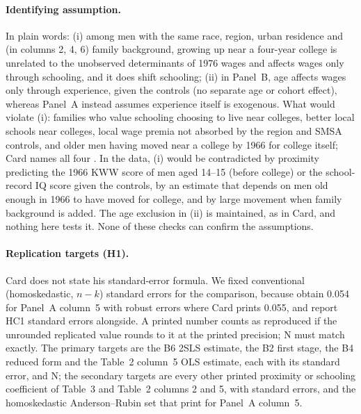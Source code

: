 \documentclass[11pt]{article}
\begin{document}
\paragraph{Identifying assumption.} In plain words: (i) among men with the same race,
region, urban residence and (in columns 2, 4, 6) family background, growing up near a
four-year college is unrelated to the unobserved determinants of 1976 wages and affects
wages only through schooling, and it does shift schooling; (ii) in Panel~B, age affects
wages only through experience, given the controls (no separate age or cohort effect),
whereas Panel~A instead assumes experience itself is exogenous. What would violate (i):
families who value schooling choosing to live near colleges, better local schools near
colleges, local wage premia not absorbed by the region and SMSA controls, and older men
having moved near a college by 1966 for college itself; Card names all four
\citep[pp.~16--18]{card1993nber}. In the data, (i) would be contradicted by proximity
predicting the 1966 KWW score of men aged 14--15 (before college) or the school-record IQ
score given the controls, by an estimate that depends on men old enough in 1966 to have
moved for college, and by large movement when family background is added. The age
exclusion in (ii) is maintained, as in Card, and nothing here tests it. None of these
checks can confirm the assumptions.

\paragraph{Replication targets (H1).} Card does not state his standard-error formula. We
fixed conventional (homoskedastic, $n-k$) standard errors for the comparison, because
\citet{blandhol2025tsls} obtain 0.054 for Panel~A column~5 with robust errors where Card %
prints 0.055, and report HC1 standard errors alongside. A printed number counts as %
reproduced if the unrounded replicated value rounds to it at the printed precision; N must
match exactly. The \HOnePrimaryTargets{} primary targets are the B6 2SLS estimate, the B2 first stage, the B4
reduced form and the Table~2 column~5 OLS estimate, each with its standard error, and N;
the \HOneSecondaryTargets{} secondary targets are every other printed proximity or schooling coefficient of
Table~3 and Table~2 columns 2 and 5, with standard errors, and the homoskedastic
Anderson--Rubin set that \citet{cinelli2025omitted} print for Panel~A column~5.
\end{document}
